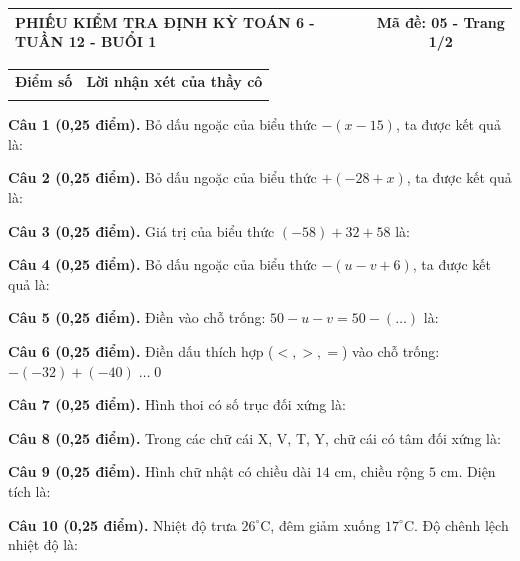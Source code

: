 \documentclass[12pt,a4paper]{article}
\begin{document}
\pagestyle{empty}
\noindent
\begin{tabularx}{\linewidth}{|X|c|}
\hline
\textbf{PHIẾU KIỂM TRA ĐỊNH KỲ TOÁN 6 - TUẦN 12 - BUỔI 1} & \textbf{Mã đề: 05 - Trang 1/2} \\
\hline
\end{tabularx}

\vspace{1.0mm}

\noindent
\begin{tabularx}{\linewidth}{|p{3.2cm}|X|}
\hline
\centering\textbf{Điểm số} & \centering\textbf{Lời nhận xét của thầy cô} \tabularnewline
\rule{0pt}{1.8cm} & \\
\hline
\end{tabularx}

\vspace{1.0mm}
\noindent\textbf{Câu 1 (0,25 điểm).} Bỏ dấu ngoặc của biểu thức $-(x - 15)$, ta được kết quả là: \par\vspace{0.10mm}
\noindent\textbf{Câu 2 (0,25 điểm).} Bỏ dấu ngoặc của biểu thức $+(-28 + x)$, ta được kết quả là: \par\vspace{0.10mm}
\noindent\textbf{Câu 3 (0,25 điểm).} Giá trị của biểu thức $(-58) + 32 + 58$ là: \par\vspace{0.10mm}
\noindent\textbf{Câu 4 (0,25 điểm).} Bỏ dấu ngoặc của biểu thức $-(u - v + 6)$, ta được kết quả là: \par\vspace{0.10mm}
\noindent\textbf{Câu 5 (0,25 điểm).} Điền vào chỗ trống: $50 - u - v = 50 - (\dots)$ là: \par\vspace{0.10mm}
\noindent\textbf{Câu 6 (0,25 điểm).} Điền dấu thích hợp ($<, >, =$) vào chỗ trống: $-(-32) + (-40) \; \dots \; 0$ \shortans{<}\par\vspace{0.10mm}
\noindent\textbf{Câu 7 (0,25 điểm).} Hình thoi có số trục đối xứng là: \par\vspace{0.10mm}
\noindent\textbf{Câu 8 (0,25 điểm).} Trong các chữ cái X, V, T, Y, chữ cái có tâm đối xứng là: \par\vspace{0.10mm}
\noindent\textbf{Câu 9 (0,25 điểm).} Hình chữ nhật có chiều dài $14\text{ cm}$, chiều rộng $5\text{ cm}$. Diện tích là: \par\vspace{0.10mm}
\noindent\textbf{Câu 10 (0,25 điểm).} Nhiệt độ trưa $26^\circ\text{C}$, đêm giảm xuống $17^\circ\text{C}$. Độ chênh lệch nhiệt độ là: \par\vspace{0.10mm}
\end{document}

